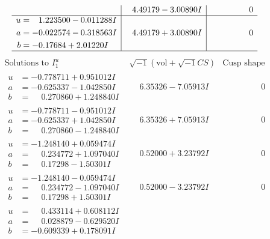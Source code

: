 \documentclass[1p]{elsarticle_modified}
\theoremstyle{definition}
\newcommand{\I}{\sqrt{-1}}
\begin{document}
$$\begin{array}{c|c|c}
 & \phantom{-}4.49179 - 3.00890 I & \phantom{-0.000000 } 0 \\ \hline\begin{aligned}
u &= \phantom{-}1.223500 - 0.011288 I \\
a &= -0.022574 - 0.318563 I \\
b &= -0.17684 + 2.01220 I\end{aligned}
 & \phantom{-}4.49179 + 3.00890 I & \phantom{-0.000000 } 0\\
 \hline 
 \end{array}$$\newpage$$\begin{array}{c|c|c}  
\text{Solutions to }I^u_{1}& \I (\text{vol} + \sqrt{-1}CS) & \text{Cusp shape}\\
 \hline 
\begin{aligned}
u &= -0.778711 + 0.951012 I \\
a &= -0.625337 - 1.042850 I \\
b &= \phantom{-}0.270860 + 1.248840 I\end{aligned}
 & \phantom{-}6.35326 - 7.05913 I & \phantom{-0.000000 } 0 \\ \hline\begin{aligned}
u &= -0.778711 - 0.951012 I \\
a &= -0.625337 + 1.042850 I \\
b &= \phantom{-}0.270860 - 1.248840 I\end{aligned}
 & \phantom{-}6.35326 + 7.05913 I & \phantom{-0.000000 } 0 \\ \hline\begin{aligned}
u &= -1.248140 + 0.059474 I \\
a &= \phantom{-}0.234772 + 1.097040 I \\
b &= \phantom{-}0.17298 - 1.50301 I\end{aligned}
 & \phantom{-}0.52000 + 3.23792 I & \phantom{-0.000000 } 0 \\ \hline\begin{aligned}
u &= -1.248140 - 0.059474 I \\
a &= \phantom{-}0.234772 - 1.097040 I \\
b &= \phantom{-}0.17298 + 1.50301 I\end{aligned}
 & \phantom{-}0.52000 - 3.23792 I & \phantom{-0.000000 } 0 \\ \hline\begin{aligned}
u &= \phantom{-}0.433114 + 0.608112 I \\
a &= \phantom{-}0.028879 - 0.629520 I \\
b &= -0.609339 + 0.178091 I\end{aligned}

\end{array}$$
\end{document}
